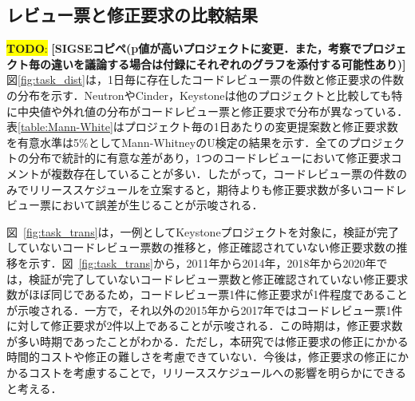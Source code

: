 \documentclass[11pt]{jreport}
\newcommand{\todo}[1]{\colorbox{yellow}{{\bf TODO}:}{\color{red} {\textbf{[#1]}}}}
\begin{document}
\subsection{レビュー票と修正要求の比較結果}


\todo{SIGSEコピペ(p値が高いプロジェクトに変更．また，考察でプロジェクト毎の違いを議論する場合は付録にそれぞれのグラフを添付する可能性あり)}
図\ref{fig:task_dist}は，1日毎に存在したコードレビュー票の件数と修正要求の件数の分布を示す．NeutronやCinder，Keystoneは他のプロジェクトと比較しても特に中央値や外れ値の分布がコードレビュー票と修正要求で分布が異なっている．表\ref{table:Mann-White}はプロジェクト毎の1日あたりの変更提案数と修正要求数を有意水準は5\%としてMann-WhitneyのU検定の結果を示す．全てのプロジェクトの分布で統計的に有意な差があり，1つのコードレビューにおいて修正要求コメントが複数存在していることが多い．したがって，コードレビュー票の件数のみでリリーススケジュールを立案すると，期待よりも修正要求数が多いコードレビュー票において誤差が生じることが示唆される．

図~\ref{fig:task_trans}は，一例としてKeystoneプロジェクトを対象に，検証が完了していないコードレビュー票数の推移と，修正確認されていない修正要求数の推移を示す．図~\ref{fig:task_trans}から，2011年から2014年，2018年から2020年では，検証が完了していないコードレビュー票数と修正確認されていない修正要求数がほぼ同じであるため，コードレビュー票1件に修正要求が1件程度であることが示唆される．一方で，それ以外の2015年から2017年ではコードレビュー票1件に対して修正要求が2件以上であることが示唆される．この時期は，修正要求数が多い時期であったことがわかる．ただし，本研究では修正要求の修正にかかる時間的コストや修正の難しさを考慮できていない．今後は，修正要求の修正にかかるコストを考慮することで，リリーススケジュールへの影響を明らかにできると考える．
\end{document}

